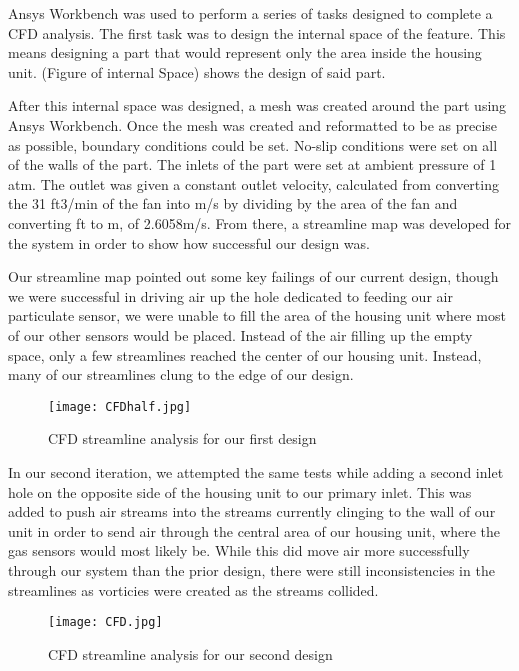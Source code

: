 Ansys Workbench was used to perform a series of tasks designed to complete a CFD analysis. The first task was to design the internal space of the feature. This means designing a part that would represent only the area inside the housing unit. (Figure of internal Space) shows the design of said part.

After this internal space was designed, a mesh was created around the part using Ansys Workbench. Once the mesh was created and reformatted to be as precise as possible, boundary conditions could be set. No-slip conditions were set on all of the walls of the part. The inlets of the part were set at ambient pressure of 1 atm. The outlet was given a constant outlet velocity, calculated from converting the 31 ft3/min of the fan into m/s by dividing by the area of the fan and converting ft to m, of 2.6058m/s. From there, a streamline map was developed for the system in order to show how successful our design was.

Our streamline map pointed out some key failings of our current design, though we were successful in driving air up the hole dedicated to feeding our air particulate sensor, we were unable to fill the area of the housing unit where most of our other sensors would be placed. Instead of the air filling up the empty space, only a few streamlines reached the center of our housing unit. Instead, many of our streamlines clung to the edge of our design.

\begin{figure}[H]
	\centering
	\texttt{[image: CFDhalf.jpg]}
	\caption{CFD streamline analysis for our first design}
	\label{fig:CFD1}
\end{figure}

In our second iteration, we attempted the same tests while adding a second inlet hole on the opposite side of the housing unit to our primary inlet. This was added to push air streams into the streams currently clinging to the wall of our unit in order to send air through the central area of our housing unit, where the gas sensors would most likely be. While this did move air more successfully through our system than the prior design, there were still inconsistencies in the streamlines as vorticies were created as the streams collided.

\begin{figure}[H]
	\centering
	\texttt{[image: CFD.jpg]}
	\caption{CFD streamline analysis for our second design}
	\label{fig:CFD2}
\end{figure}

